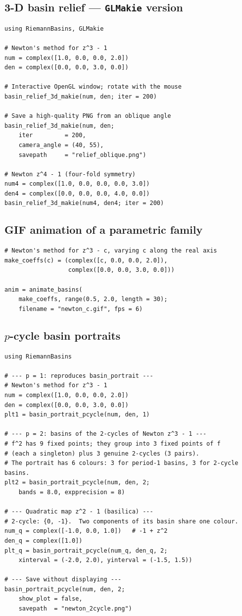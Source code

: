\documentclass[11pt,a4paper]{article}
\theoremstyle{definition}
\newcommand{\pkg}[1]{\texttt{#1}}
\begin{document}
\subsection{3-D basin relief — \pkg{GLMakie} version}

\begin{lstlisting}
using RiemannBasins, GLMakie

# Newton's method for z^3 - 1
num = complex([1.0, 0.0, 0.0, 2.0])
den = complex([0.0, 0.0, 3.0, 0.0])

# Interactive OpenGL window; rotate with the mouse
basin_relief_3d_makie(num, den; iter = 200)

# Save a high-quality PNG from an oblique angle
basin_relief_3d_makie(num, den;
    iter         = 200,
    camera_angle = (40, 55),
    savepath     = "relief_oblique.png")

# Newton z^4 - 1 (four-fold symmetry)
num4 = complex([1.0, 0.0, 0.0, 0.0, 3.0])
den4 = complex([0.0, 0.0, 0.0, 4.0, 0.0])
basin_relief_3d_makie(num4, den4; iter = 200)
\end{lstlisting}

\subsection{GIF animation of a parametric family}

\begin{lstlisting}
# Newton's method for z^3 - c, varying c along the real axis
make_coeffs(c) = (complex([c, 0.0, 0.0, 2.0]),
                  complex([0.0, 0.0, 3.0, 0.0]))

anim = animate_basins(
    make_coeffs, range(0.5, 2.0, length = 30);
    filename = "newton_c.gif", fps = 6)
\end{lstlisting}


\subsection{$p$-cycle basin portraits}

\begin{lstlisting}
using RiemannBasins

# --- p = 1: reproduces basin_portrait ---
# Newton's method for z^3 - 1
num = complex([1.0, 0.0, 0.0, 2.0])
den = complex([0.0, 0.0, 3.0, 0.0])
plt1 = basin_portrait_pcycle(num, den, 1)

# --- p = 2: basins of the 2-cycles of Newton z^3 - 1 ---
# f^2 has 9 fixed points; they group into 3 fixed points of f
# (each a singleton) plus 3 genuine 2-cycles (3 pairs).
# The portrait has 6 colours: 3 for period-1 basins, 3 for 2-cycle basins.
plt2 = basin_portrait_pcycle(num, den, 2;
    bands = 8.0, expprecision = 8)

# --- Quadratic map z^2 - 1 (basilica) ---
# 2-cycle: {0, -1}.  Two components of its basin share one colour.
num_q = complex([-1.0, 0.0, 1.0])   # -1 + z^2
den_q = complex([1.0])
plt_q = basin_portrait_pcycle(num_q, den_q, 2;
    xinterval = (-2.0, 2.0), yinterval = (-1.5, 1.5))

# --- Save without displaying ---
basin_portrait_pcycle(num, den, 2;
    show_plot = false,
    savepath  = "newton_2cycle.png")
\end{lstlisting}
\end{document}
